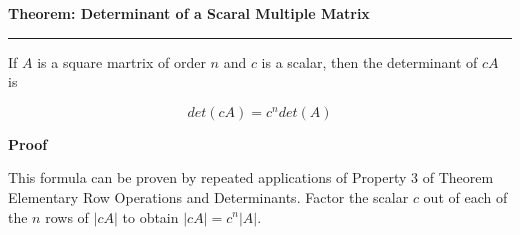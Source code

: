 \nopagenumbers
{\bf Theorem: Determinant of a Scaral Multiple Matrix}
\vskip 1mm
\hrule

\vskip 6pt
If $A$ is a square martrix of order $n$ and $c$ is a scalar, then the determinant of $cA$ is

$$det(cA)=c^ndet(A)$$

\vskip 10pt
{\bf Proof}

\vskip 6pt
This formula can be proven by repeated applications of Property 3 of Theorem Elementary Row Operations and Determinants. Factor the scalar $c$ out of each of the $n$ rows of $|cA|$ to obtain $|cA|=c^n|A|$.

\vfill\eject
\bye
